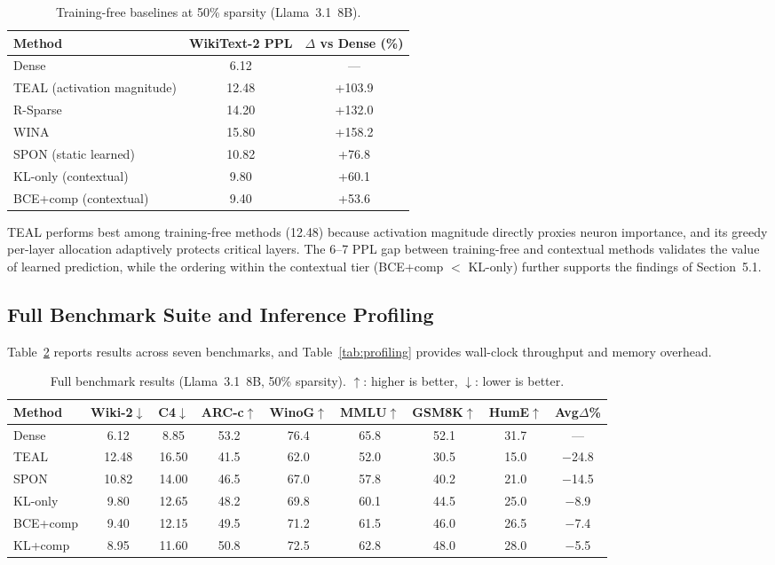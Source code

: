 \documentclass[11pt]{article}
\begin{document}
\begin{table}[h]
\centering
\caption{Training-free baselines at 50\% sparsity (Llama~3.1~8B).}
\label{tab:baselines}
\small
\begin{tabular}{lcc}
\toprule
Method & WikiText-2 PPL & $\Delta$ vs Dense (\%) \\
\midrule
Dense & 6.12 & --- \\
TEAL (activation magnitude) & 12.48 & +103.9 \\
R-Sparse & 14.20 & +132.0 \\
WINA & 15.80 & +158.2 \\
\midrule
SPON (static learned) & 10.82 & +76.8 \\
KL-only (contextual) & 9.80 & +60.1 \\
BCE+comp (contextual) & 9.40 & +53.6 \\
\bottomrule
\end{tabular}
\end{table}

TEAL performs best among training-free methods (12.48) because activation magnitude directly proxies neuron importance, and its greedy per-layer allocation adaptively protects critical layers.
The 6--7 PPL gap between training-free and contextual methods validates the value of learned prediction, while the ordering within the contextual tier (BCE+comp $<$ KL-only) further supports the findings of Section~5.1.

\subsection{Full Benchmark Suite and Inference Profiling}

Table~\ref{tab:full_bench} reports results across seven benchmarks, and Table~\ref{tab:profiling} provides wall-clock throughput and memory overhead.

\begin{table}[h]
\centering
\caption{Full benchmark results (Llama~3.1~8B, 50\% sparsity). $\uparrow$: higher is better, $\downarrow$: lower is better.}
\label{tab:full_bench}
\small
\begin{tabular}{lccccccc c}
\toprule
Method & Wiki-2$\downarrow$ & C4$\downarrow$ & ARC-c$\uparrow$ & WinoG$\uparrow$ & MMLU$\uparrow$ & GSM8K$\uparrow$ & HumE$\uparrow$ & Avg$\Delta$\% \\
\midrule
Dense & 6.12 & 8.85 & 53.2 & 76.4 & 65.8 & 52.1 & 31.7 & --- \\
TEAL & 12.48 & 16.50 & 41.5 & 62.0 & 52.0 & 30.5 & 15.0 & $-$24.8 \\
SPON & 10.82 & 14.00 & 46.5 & 67.0 & 57.8 & 40.2 & 21.0 & $-$14.5 \\
KL-only & 9.80 & 12.65 & 48.2 & 69.8 & 60.1 & 44.5 & 25.0 & $-$8.9 \\
BCE+comp & 9.40 & 12.15 & 49.5 & 71.2 & 61.5 & 46.0 & 26.5 & $-$7.4 \\
KL+comp & 8.95 & 11.60 & 50.8 & 72.5 & 62.8 & 48.0 & 28.0 & $-$5.5 \\
\bottomrule
\end{tabular}
\end{table}
\end{document}
